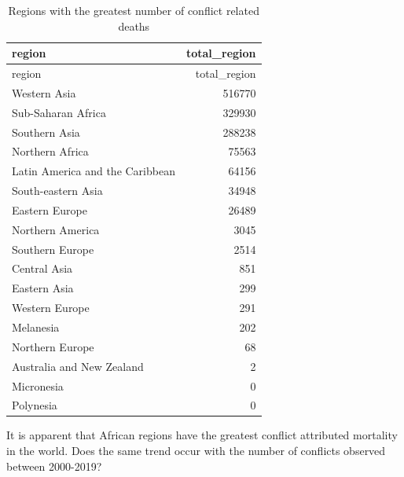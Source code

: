 \documentclass[
  letterpaper,
  DIV=11,
  numbers=noendperiod]{scrartcl}
\begin{document}
\begin{longtable}[]{@{}lr@{}}
\caption{Regions with the greatest number of conflict related
deaths}\tabularnewline
\toprule\noalign{}
region & total\_region \\
\midrule\noalign{}
\endfirsthead
\toprule\noalign{}
region & total\_region \\
\midrule\noalign{}
\endhead
\bottomrule\noalign{}
\endlastfoot
Western Asia & 516770 \\
Sub-Saharan Africa & 329930 \\
Southern Asia & 288238 \\
Northern Africa & 75563 \\
Latin America and the Caribbean & 64156 \\
South-eastern Asia & 34948 \\
Eastern Europe & 26489 \\
Northern America & 3045 \\
Southern Europe & 2514 \\
Central Asia & 851 \\
Eastern Asia & 299 \\
Western Europe & 291 \\
Melanesia & 202 \\
Northern Europe & 68 \\
Australia and New Zealand & 2 \\
Micronesia & 0 \\
Polynesia & 0 \\
\end{longtable}

It is apparent that African regions have the greatest conflict
attributed mortality in the world. Does the same trend occur with the
number of conflicts observed between 2000-2019?
\end{document}
